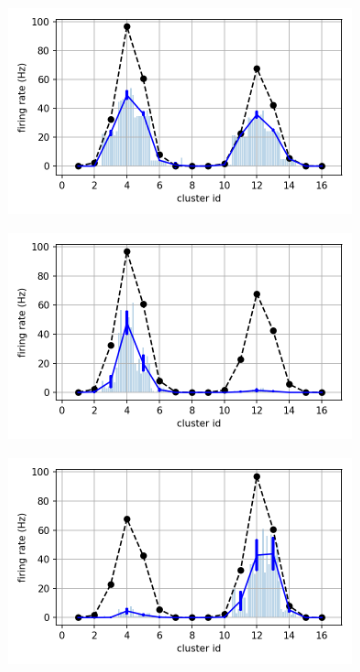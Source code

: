 \begin{figure}[h]
\begin{subfigure}{.32\textwidth}
\centering
\includegraphics[width=\linewidth]{img/chapter4/selective_amplification_ff.png}
\caption{}
\label{fig:selective_amplification_ff}
\end{subfigure}
\hfill
\begin{subfigure}{.32\textwidth}
\centering
\includegraphics[width=\linewidth]{img/chapter4/selective_amplification_inh_WTA_L3.png}
\caption{}
\label{fig:selective_amplification_l}
\end{subfigure}
\hfill
\begin{subfigure}{.32\textwidth}
\centering
\includegraphics[width=\linewidth]{img/chapter4/selective_amplification_inh_WTA_R2.png}

\end{subfigure}
\end{figure}
